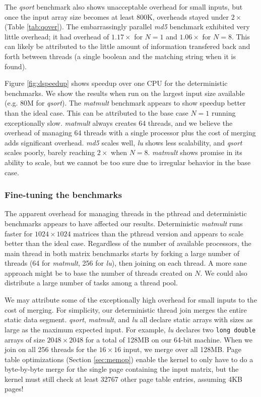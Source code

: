 The \emph{qsort} benchmark also shows unacceptable overhead for small inputs,
but once the input array size becomes at least 800K, overheads stayed under
$2\times$ (Table \ref{tab:qover}).
The embarrassingly parallel \emph{md5} benchmark exhibited very little overhead;
it had overhead of $1.17\times$ for $N=1$ and $1.06\times$ for $N=8$. This
can likely be attributed to the little amount of information transfered back and
forth between threads (a single boolean and the matching string when it is
found).


Figure \ref{fig:dspeedup} shows speedup over one CPU for the deterministic
benchmarks. We show the results when run on the largest input size available
(e.g. 80M for \emph{qsort}). The \emph{matmult} benchmark appears to show
speedup better than the ideal case. This can be attributed to the base case
$N=1$ running exceptionally slow. \emph{matmult} always creates 64 threads, and
we believe the overhead of managing 64 threads with a single processor plus the
cost of merging adds significant overhead. \emph{md5} scales well,
\emph{lu} shows less scalability, and \emph{qsort} scales poorly, barely
reaching $2\times$ when $N=8$. \emph{matmult} shows promise in its ability to
scale, but we cannot be too sure due to irregular behavior in the base case.

\subsubsection{Fine-tuning the benchmarks}
The apparent overhead for managing threads in the pthread and deterministic
benchmarks appears to have affected our results. Deterministic \emph{matmult}
runs faster for $1024\times 1024$ matrices than the pthread version and appears
to scale better than the ideal case. Regardless of the number of available
processors, the main thread in both matrix benchmarks starts by forking a large
number of threads (64 for \emph{matmult}, 256 for \emph{lu}), then joining on
each thread. A more sane approach might be to base the number of threads created
on $N$. We could also distribute a large number of tasks among a thread pool.

We may attribute some of the exceptionally high overhead for small inputs to
the cost of merging. For simplicity, our deterministic thread join merges the
entire static data segment. \emph{qsort}, \emph{matmult}, and \emph{lu} all
declare static arrays with sizes as large as the maximum expected input. For
example, \emph{lu} declares two {\tt long double} arrays of size
$2048\times 2048$ for a total of 128MB on our 64-bit machine. When we join on
all 256 threads for the $16\times 16$ input, we merge over all 128MB. Page
table optimizations (Section \ref{sec:memop}) enable the kernel to only have to
do a \mbox{byte-by-byte} merge for the single page containing the input matrix,
but the kernel must still check at least 32767 other page table entries,
assuming 4KB pages!

